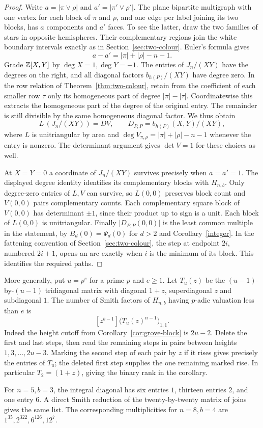 \begin{proof}
Write \(a=|\pi\vee\rho|\) and \(a'=|\pi'\vee\rho'|\).
The plane bipartite multigraph with one vertex for each block of
\(\pi\) and \(\rho\), and one edge per label joining its two blocks,
has \(a\) components and \(a'\) faces. To see the latter, draw the two
families of stars in opposite hemispheres. Their complementary regions
join the white boundary intervals exactly as in
Section~\ref{sec:two-colour}. Euler's formula gives
\[
             a-a'=|\pi|+|\rho|-n-1 .
\]
Grade \(\mathbb Z[X,Y]\) by \(\deg X=1,\deg Y=-1\). The entries of
\(J_n/(XY)\) have the degrees on the right, and all diagonal factors
\(b_{h(P)}/(XY)\) have degree zero. In the row relation of
Theorem~\ref{thm:two-colour}, retain from the coefficient of each
smaller row \(\tau\) only its homogeneous part of degree
\(|\pi|-|\tau|\). Coordinatewise this extracts the homogeneous
part of the degree of the original entry. The remainder is still
divisible by the same homogeneous diagonal factor. We thus obtain
\[
 L\,(J_n/(XY))=D V,\qquad D_{P,P}=b_{h(P)}(X,Y)/(XY),
\]
where \(L\) is unitriangular by area and
\(\deg V_{\pi,\rho}=|\pi|+|\rho|-n-1\) whenever the entry is nonzero.
The determinant argument gives \(\det V=1\) for these choices as well.

At \(X=Y=0\) a coordinate of \(J_n/(XY)\) survives precisely when
\(a=a'=1\). The displayed degree identity identifies its complementary
blocks with \(H_{n,b}\). Only degree-zero entries of \(L,V\) can
survive, so \(L(0,0)\) preserves block count and \(V(0,0)\) pairs
complementary counts. Each complementary square block of \(V(0,0)\)
has determinant \(\pm1\), since their product up to sign is a unit.
Each block of \(L(0,0)\) is unitriangular. Finally
\(\lvert D_{P,P}(0,0)\rvert\) is the least common multiple in the
statement, by \(B_d(0)=\Psi_d(0)\) for \(d>2\) and
Corollary~\ref{integer}. In the fattening convention of
Section~\ref{sec:two-colour}, the step at endpoint \(2i\), numbered
\(2i+1\), opens an arc exactly when \(i\) is the minimum of its
block. This identifies the required paths.
\end{proof}

More generally, put \(u=p^e\) for a prime \(p\) and \(e\ge1\).
Let \(T_u(z)\) be the \((u-1)\)-by-\((u-1)\) tridiagonal matrix
with diagonal \(1+z\), superdiagonal \(z\) and subdiagonal \(1\).
The number of Smith factors of \(H_{n,b}\) having \(p\)-adic
valuation less than \(e\) is
\[
              [z^{b-1}]\bigl(T_u(z)^{n-1}\bigr)_{1,1}.
\]
Indeed the height cutoff from Corollary~\ref{cor:grove-block} is
\(2u-2\). Delete the first and last steps, then read the remaining
steps in pairs between heights \(1,3,\ldots,2u-3\). Marking the
second step of each pair by \(z\) if it rises gives precisely
the entries of \(T_u\); the deleted first step supplies the one
remaining marked rise. In particular \(T_2=(1+z)\), giving the
binary rank in the corollary.

For \(n=5,b=3\), the integral diagonal has six entries \(1\),
thirteen entries \(2\), and one entry \(6\). A direct Smith reduction
of the twenty-by-twenty matrix of joins gives the same list. The
corresponding multiplicities for \(n=8,b=4\) are
\(1^{35},2^{322},6^{126},12^7\).
